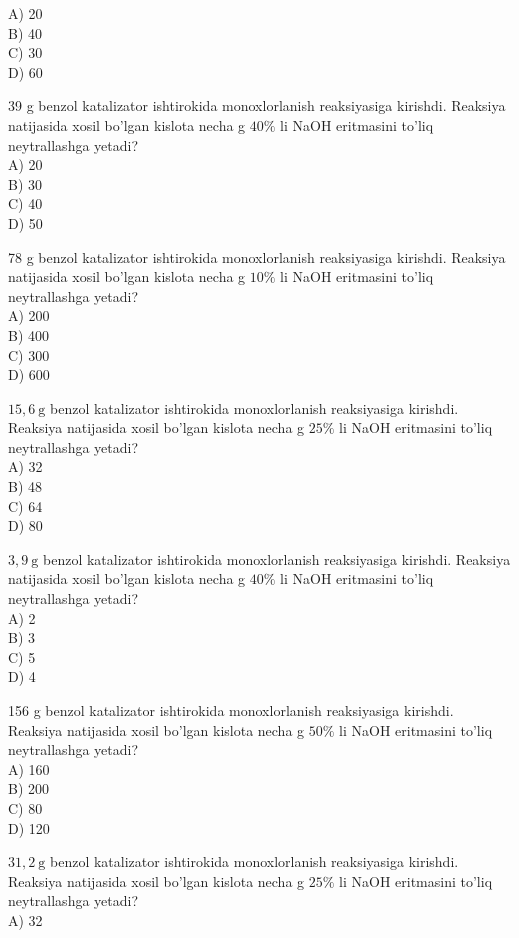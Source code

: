 A) 20\\
B) 40\\
C) 30\\
D) 60
  \item 39 g benzol katalizator ishtirokida monoxlorlanish reaksiyasiga kirishdi. Reaksiya natijasida xosil bo'lgan kislota necha g $40 \%$ li NaOH eritmasini to'liq neytrallashga yetadi?\\
A) 20\\
B) 30\\
C) 40\\
D) 50
  \item 78 g benzol katalizator ishtirokida monoxlorlanish reaksiyasiga kirishdi. Reaksiya natijasida xosil bo'lgan kislota necha g $10 \%$ li NaOH eritmasini to'liq neytrallashga yetadi?\\
A) 200\\
B) 400\\
C) 300\\
D) 600
  \item $15,6 \mathrm{~g}$ benzol katalizator ishtirokida monoxlorlanish reaksiyasiga kirishdi. Reaksiya natijasida xosil bo'lgan kislota necha g $25 \%$ li NaOH eritmasini to'liq neytrallashga yetadi?\\
A) 32\\
B) 48\\
C) 64\\
D) 80
  \item $3,9 \mathrm{~g}$ benzol katalizator ishtirokida monoxlorlanish reaksiyasiga kirishdi. Reaksiya natijasida xosil bo'lgan kislota necha g $40 \%$ li NaOH eritmasini to'liq neytrallashga yetadi?\\
A) 2\\
B) 3\\
C) 5\\
D) 4
  \item 156 g benzol katalizator ishtirokida monoxlorlanish reaksiyasiga kirishdi. Reaksiya natijasida xosil bo'lgan kislota necha g $50 \%$ li NaOH eritmasini to'liq neytrallashga yetadi?\\
A) 160\\
B) 200\\
C) 80\\
D) 120
  \item $31,2 \mathrm{~g}$ benzol katalizator ishtirokida monoxlorlanish reaksiyasiga kirishdi. Reaksiya natijasida xosil bo'lgan kislota necha g $25 \%$ li NaOH eritmasini to'liq neytrallashga yetadi?\\
A) 32\\
